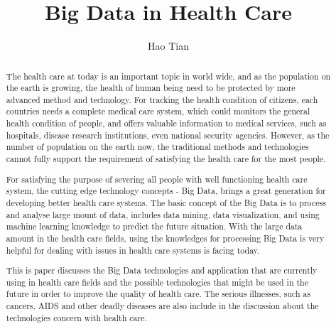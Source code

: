 
\title{Big Data in Health Care}

\author{Hao Tian}


\renewcommand{\shortauthors}{H. Tian.}


\begin{abstract}
The health care at today is an important topic in world wide, and as the population on the earth is growing, the health of human being need to be protected by more advanced method and technology. For tracking the health condition of citizens, each countries needs a complete medical care system, which could monitors the general health condition of people, and offers valuable information to medical services, such as hospitals, disease research institutions, even national security agencies. However, as the number of population on the earth now, the traditional methods and technologies cannot fully support the requirement of satisfying the health care for the most people.

For satisfying the purpose of severing all people with well functioning health care system, the cutting edge technology concepts - Big Data, brings a great generation for developing better health care systems. The basic concept of the Big Data is to process and analyse large mount of data, includes data mining, data visualization, and using machine learning knowledge to predict the future situation. With the large data amount in the health care fields, using the knowledges for processing Big Data is very helpful for dealing with issues in health care systems is facing today. 

This is paper discusses the Big Data technologies and application that are currently using in health care fields and the possible technologies that might be used in the future in order to improve the quality of health care. The serious illnesses, such as cancers, AIDS and other deadly diseases are also include in the discussion about the technologies concern with health care. 
\end{abstract} 


\maketitle

